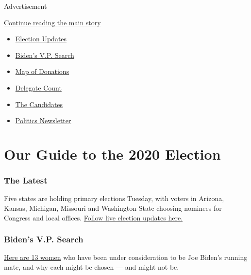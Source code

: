 Advertisement

\protect\hyperlink{after-subheader}{Continue reading the main story}

\begin{itemize}
\item
  \href{https://www.nytimes3xbfgragh.onion/2020/08/04/us/elections/primary-election-michigan-arizona-kansas.html}{Election
  Updates}
\item
  \href{https://www.nytimes3xbfgragh.onion/article/biden-vice-president-2020.html}{Biden's
  V.P. Search}
\item
  \href{https://www.nytimes3xbfgragh.onion/interactive/2020/07/24/us/politics/trump-biden-campaign-donors.html}{Map
  of Donations}
\item
  \href{https://www.nytimes3xbfgragh.onion/interactive/2020/us/elections/delegate-count-primary-results.html}{Delegate
  Count}
\item
  \href{https://www.nytimes3xbfgragh.onion/interactive/2019/us/politics/2020-presidential-candidates.html}{The
  Candidates}
\item
  \href{https://www.nytimes3xbfgragh.onion/newsletters/politics}{Politics
  Newsletter}
\end{itemize}

\hypertarget{our-guide-to-the-2020-election}{%
\section{Our Guide to the 2020
Election}\label{our-guide-to-the-2020-election}}

\hypertarget{the-latest}{%
\subsubsection{The Latest}\label{the-latest}}

Five states are holding primary elections Tuesday, with voters in
Arizona, Kansas, Michigan, Missouri and Washington State choosing
nominees for Congress and local offices.
\href{https://www.nytimes3xbfgragh.onion/2020/08/04/us/elections/primary-election-michigan-arizona-kansas.html}{Follow
live election updates here.}

\hypertarget{bidens-vp-search}{%
\subsubsection{Biden's V.P. Search}\label{bidens-vp-search}}

\href{https://www.nytimes3xbfgragh.onion/article/biden-vice-president-2020.html}{Here
are 13 women} who have been under consideration to be Joe Biden's
running mate, and why each might be chosen --- and might not be.

